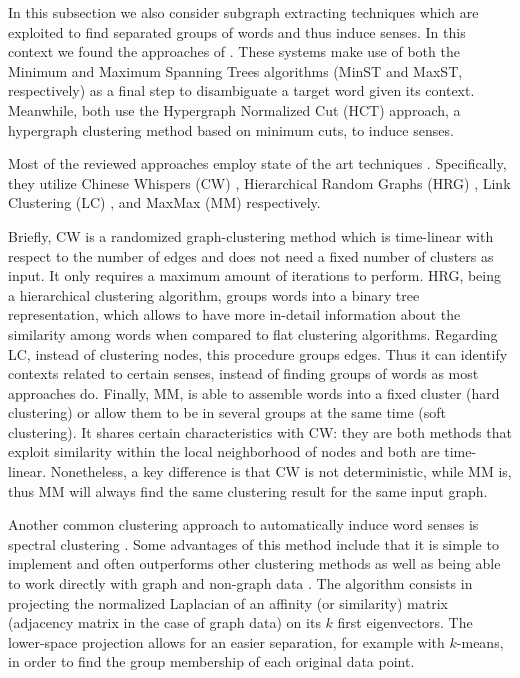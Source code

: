 In this subsection we also consider  subgraph extracting techniques which are exploited to find separated groups of words and thus induce senses. In this context we found the approaches of \cite{2004.Veronis,2010.Siberer.GraphCooccurrenceWSD}. These systems make use of both the Minimum and Maximum Spanning Trees algorithms (MinST and MaxST, respectively) as a final step to  disambiguate a target word given its context.  Meanwhile, both \cite{2011.Haishan.AHypergraphbased,2014.Tao.Qian.LexicalChainHypergraphWSI}  use the Hypergraph Normalized Cut (HCT) approach, a hypergraph clustering method based on minimum cuts, to induce senses.

Most of the reviewed approaches employ state of the art techniques \cite{2008.Klapaftis.WSIUsingCollocations,2010.Klapaftis.WSD.WSD.HierarchicalGraphs,2011.Jurgens.WSICommunityDetection,2013.Hope.GradedWSI}. Specifically, they utilize Chinese Whispers (CW)  \cite{biemann2006chinese}, Hierarchical Random Graphs (HRG)  \cite{clauset2008hierarchical}, Link Clustering (LC)  \cite{ahn2010link}, and MaxMax (MM)  \cite{hope2013maxmax} respectively. 

Briefly, CW is a randomized graph-clustering method  which is time-linear with respect to the number of edges and does not need a fixed number of clusters as input. It only requires a maximum amount of iterations to perform. HRG, being a hierarchical clustering algorithm, groups words into a binary tree representation, which allows to have more in-detail information about the similarity among words when compared to flat clustering algorithms. Regarding LC, instead of clustering nodes, this procedure groups edges. Thus it can identify contexts related to certain senses, instead of finding groups of words as most approaches do. Finally, MM, is able to assemble words into a fixed cluster (hard clustering) or allow them to be in several groups at the same time (soft clustering). It shares certain characteristics with CW:  they are both methods that exploit similarity within the local neighborhood of nodes and both are time-linear. Nonetheless, a key difference is that CW is not deterministic, while MM is, thus MM will always find the same clustering result for the same input graph.

Another common clustering approach to automatically induce word senses \cite{GoyalH14,Song16} is spectral clustering \cite{Shi2000} . Some advantages of this method include that it is simple to implement and often outperforms other clustering methods as well as being able to work directly with graph and non-graph data \cite{Luxburg2007}.
%
The algorithm consists in projecting the normalized Laplacian  of an affinity (or similarity) matrix (adjacency matrix in the case of graph data) on its $k$ first eigenvectors. The lower-space projection allows for an easier separation, for example with $k$-means, in order to find the  group membership of each original data point. 

